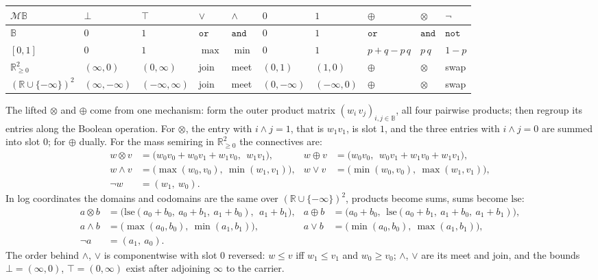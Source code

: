\documentclass[anon]{../../journal-templates/NeSy26/nesy2026} %
\begin{document}
\begin{center}\footnotesize\setlength{\tabcolsep}{3pt}
\begin{tabular}{@{}l|llll|llll|l@{}}
$\mathcal M\mathbb B$ & $\bot$ & $\top$ & $\vee$ & $\wedge$ & $0$ & $1$ & $\oplus$ & $\otimes$ & $\neg$ \\
\hline
$\mathbb B$ & $0$ & $1$ & $\mathtt{or}$ & $\mathtt{and}$ & $0$ & $1$ & $\mathtt{or}$ & $\mathtt{and}$ & $\mathtt{not}$ \\[2pt]
$[0,1]$ & $0$ & $1$ & $\max$ & $\min$ & $0$ & $1$ & $p {+} q {-} p\,q$ & $p\,q$ & $1 - p$ \\[2pt]
$\mathbb R_{\ge 0}^{2}$ & $(\infty, 0)$ & $(0, \infty)$ & join & meet & $(0,1)$ & $(1,0)$ & $\oplus$ & $\otimes$ & swap \\[2pt]
$(\mathbb R {\cup} \{-\infty\})^{2}$ & $(\infty, -\infty)$ & $(-\infty, \infty)$ & join & meet & $(0, -\infty)$ & $(-\infty, 0)$ & $\oplus$ & $\otimes$ & swap \\
\end{tabular}
\end{center}

\noindent
The lifted $\otimes$ and $\oplus$ come from one mechanism: form the outer product
matrix $(w_i\,v_j)_{i,j \in \mathbb B}$, all four pairwise products;
then regroup its entries along the Boolean operation.
For $\otimes$, the entry with $i \wedge j = 1$, that is $w_1 v_1$, is
slot $1$, and the three entries with $i \wedge j = 0$ are summed into
slot $0$; for $\oplus$ dually. For the mass semiring in
$\mathbb R_{\ge 0}^{2}$ the connectives are:
\begin{align*}
  w \otimes v &= \bigl(w_0 v_0 + w_0 v_1 + w_1 v_0,\ \ w_1 v_1\bigr),
  &
  w \oplus v &= \bigl(w_0 v_0,\ \ w_0 v_1 + w_1 v_0 + w_1 v_1\bigr),\\
  w \wedge v &= \bigl(\max(w_0, v_0),\ \min(w_1, v_1)\bigr),
  &
  w \vee v &= \bigl(\min(w_0, v_0),\ \max(w_1, v_1)\bigr),\\
  \neg w &= (w_1,\ w_0).
\end{align*}
In log
coordinates the domains and codomains are the same over
$(\mathbb R \cup \{-\infty\})^{2}$, products become sums, sums become
$\mathrm{lse}$:
\begin{align*}
  a \otimes b &= \bigl(\mathrm{lse}(a_0{+}b_0,\ a_0{+}b_1,\ a_1{+}b_0),\ \ a_1 {+} b_1\bigr),
  &
  a \oplus b &= \bigl(a_0 {+} b_0,\ \ \mathrm{lse}(a_0{+}b_1,\ a_1{+}b_0,\ a_1{+}b_1)\bigr),\\
  a \wedge b &= \bigl(\max(a_0, b_0),\ \min(a_1, b_1)\bigr),
  &
  a \vee b &= \bigl(\min(a_0, b_0),\ \max(a_1, b_1)\bigr),\\
  \neg a &= (a_1,\ a_0).
\end{align*}
The order behind $\wedge$, $\vee$ is componentwise with slot $0$
reversed: $w \le v$ iff $w_1 \le v_1$ and $w_0 \ge v_0$; $\wedge$,
$\vee$ are its meet and join, and the bounds $\bot = (\infty, 0)$,
$\top = (0, \infty)$ exist after adjoining $\infty$ to the carrier.
\end{document}
